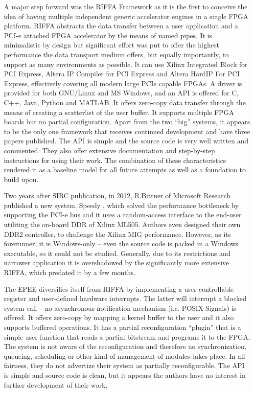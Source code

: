 A major step forward was the RIFFA Framework \cite{riffa} as it is the first to conceive the idea of having multiple 
independent generic accelerator engines in a single FPGA platform.
RIFFA abstracts the data transfer between a user application and a PCI-e attached FPGA accelerator by the means of named pipes. 
It is minimalistic by design but significant effort was put to offer the highest performance the data transport medium offers,
but equally importantly, to support as many environments as possible.
It can use Xilinx Integrated Block for PCI Express, Altera IP Compiler for PCI Express and Altera HardIP For PCI Express,
effectively covering all modern large PCIe capable FPGAs. A driver is provided for both GNU/Linux and MS Windows,
and an API is offered for C, C++, Java, Python and MATLAB. It offers zero-copy data transfer through the means of
creating a \gls{scatterlist} of the user buffer. It supports multiple FPGA boards but no partial configuration. 
Apart from the two ``big'' systems, it appears to be the only one framework that receives continued development and have three papers published.
The API is simple and the source code is very well written and commented. 
They also offer extensive documentation and step-by-step instructions for using their work.
The combination of these characteristics rendered it as a baseline model for all future attempts as well as a foundation to build upon.

Two years after SIRC publication, in 2012, R.Bittner of Microsoft Research published a new system, 
Speedy \cite{speedy}, which solved the performance bottleneck by supporting the PCI-e bus 
and it uses a random-access interface to the end-user utiliting the on-board DDR of Xilinx ML505.
Authors even designed their own DDR2 controller, to challenge the Xilinx MIG performance.
However, as its forerunner, it is Windows-only -- even the source code is packed in a Windows executable, so it could not be studied.
Generally, due to its restrictions and narrower application it is overshadowed by the significantly more extensive RIFFA,
which predated it by a few months.

The EPEE \cite{epee} diversifies itself from RIFFA by implementing a user-controllable register and user-defined hardware interrupts.
The latter will interrupt a blocked system call -- no asynchronous notification mechanism (i.e. POSIX Signals) is offered.
It offers zero-copy by mapping a kernel buffer to the user and it also supports buffered operations. 
It has a partial reconfiguration ``plugin'' that is a simple user function that reads a partial bitstream and programs it to the FPGA.
The system is not aware of the reconfiguration and therefore no synchronization, 
queueing, scheduling or other kind of management of modules takes place. 
In all fairness, they do not advertize their system as partially reconfigurable.
The API is simple and source code is clean, but it appears the authors have no interest in further development of their work.


